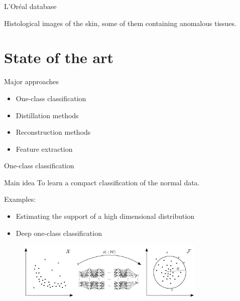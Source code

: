 \documentclass[xcolor=pdftex,dvipsnames,table,mathserif]{beamer}
\begin{document}
\begin{frame}{L'Oréal database}

Histological images of the skin, some of them containing anomalous tissues.

\end{frame}






\section{State of the art}

\begin{frame}{Major approaches}

  \begin{itemize}
  \item One-class classification
  \item Distillation methods
  \item Reconstruction methods
  \item Feature extraction
  \end{itemize}
\end{frame}


\begin{frame}{One-class classification}

\begin{block}{Main idea}
To learn a compact classification of the normal data.
\end{block}

Examples:
\begin{itemize}
\item Estimating the support of a high dimensional distribution \cite{scholkopf_estimating_2001}
\item Deep one-class classification \cite{ruff_deep_2018}
\end{itemize}

\begin{figure}[ht]
  \centering
  \includegraphics[width=0.8\textwidth]{deep_one_class_classifications}
\end{figure}

\end{frame}
\end{document}
